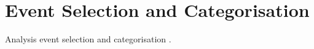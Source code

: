 \chapter{Event Selection and Categorisation}
\label{chap:analysis}


Analysis event selection and categorisation \cite{Alwall:2014hca}.
